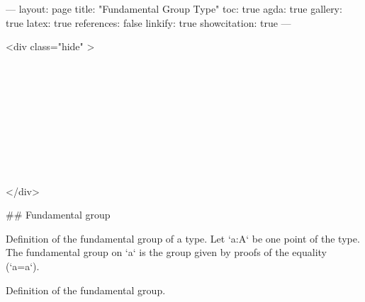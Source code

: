 ---
layout: page
title: "Fundamental Group Type"
toc: true
agda: true
gallery: true
latex: true
references: false
linkify: true
showcitation: true
---


<div class="hide" >
\begin{code}%
\>[0]\AgdaSymbol{\{-\#}\AgdaSpace{}%
\AgdaSpace{}%
\AgdaSpace{}%
\AgdaSymbol{\#-\}}\<%
\\
\>[0]\AgdaSpace{}%
\AgdaSpace{}%
\<%
\\
\>[0]\AgdaSpace{}%
\AgdaSpace{}%
\<%
\\
%
\\[\AgdaEmptyExtraSkip]%
\>[0]\AgdaSpace{}%
\AgdaSpace{}%
\<%
\\
\>[0]\AgdaSpace{}%
\AgdaSpace{}%
\<%
\\
\>[0]\AgdaSpace{}%
\AgdaSpace{}%
\<%
\\
\>[0]\AgdaSpace{}%
\AgdaSpace{}%
\<%
\\
\>[0]\AgdaSpace{}%
\AgdaSpace{}%
\<%
\end{code}
</div>

## Fundamental group

Definition of the fundamental group of a type.
Let `a:A` be one point of the type. The fundamental group on `a` is the
group given by proofs of the equality (`a=a`).

\begin{code}%
\>[0]\AgdaSpace{}%
\AgdaSpace{}%
\<%
\end{code}

Definition of the fundamental group.
\begin{code}%
\>[0][@{}l@{\AgdaIndent{1}}]%
\>[2]\<%
\\
\>[2][@{}l@{\AgdaIndent{0}}]%
\>[4]\AgdaSymbol{:}\AgdaSpace{}%
\AgdaSymbol{(}\AgdaSpace{}%
\AgdaSymbol{:}\AgdaSpace{}%
\AgdaSpace{}%
\AgdaSymbol{)}\<%
\\
%
\>[4]\AgdaComment{------------------}\<%
\\
%
\>[4]\AgdaSpace{}%
\AgdaSymbol{(}\AgdaSpace{}%
\AgdaSymbol{:}\AgdaSpace{}%
\AgdaSymbol{)}\AgdaSpace{}%
\AgdaSpace{}%
\AgdaSpace{}%
\<%
\\
\>[0]\<%
\\
%
\>[2]\AgdaSpace{}%
\AgdaSpace{}%
\AgdaSpace{}%
\AgdaSymbol{=}\AgdaSpace{}%
\AgdaSymbol{(}\AgdaSpace{}%
\AgdaOperator{\AgdaDatatype{==}}\AgdaSpace{}%
\AgdaSymbol{)}\<%
\end{code}

